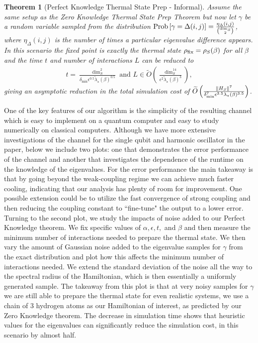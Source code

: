 \documentclass[11pt]{article}
\newtheorem{theorem}{Theorem}
\newcommand{\prob}[1]{{\rm Prob}\left[ #1 \right]}
\newcommand{\bigotilde}[1]{\widetilde{O} \left( #1 \right)}
\begin{document}
\begin{theorem}[Perfect Knowledge Thermal State Prep - Informal] 
    Assume the same setup as the Zero Knowledge Thermal State Prep Theorem but now let $\gamma$ be a random variable sampled from the distribution $\prob{\gamma = \Delta(i,j)} = \frac{\eta_\Delta(i,j)}{\binom{\dim_S}{2}}$, where $\eta_\Delta(i,j)$ is the number of times a particular eigenvalue difference appears. In this scenario the fixed point is exactly the thermal state $\rho_{\rm fix} = \rho_S(\beta)$ for all $\beta$ and the time $t$ and number of interactions $L$ can be reduced to 
    \begin{align}
         t = \frac{\dim_S^2}{\delta_{\min} \epsilon^{0.5} \widetilde{\lambda}_\star(\beta)^{0.5}}\text{ and } L \in \bigotilde{\frac{\dim_S^{14}}{\epsilon^2 \widetilde{\lambda}_\star(\beta)^3}},
     \end{align}
     giving an asymptotic reduction in the total simulation cost of $\widetilde{O}\left({\frac{\|{H_S}\|^7}{\delta_{\rm min}^7 \epsilon^{3.5}
\lambda_\star(\beta)^{3.5}}}\right)$. 
\end{theorem}

One of the key features of our algorithm is the simplicity of the resulting channel which is easy to implement on a quantum computer and easy to study numerically on classical computers. Although we have more extensive investigations of the channel for the single qubit and harmonic oscillator in the paper, below we include two plots: one that demonstrates the error performance of the channel and another that investigates the dependence of the runtime on the knowledge of the eigenvalues. For the error performance the main takeaway is that by going beyond the weak-coupling regime we can achieve much faster cooling, indicating that our analysis has plenty of room for improvement. One possible extension could be to utilize the fast convergence of strong coupling and then reducing the coupling constant to ``fine-tune" the output to a lower error. Turning to the second plot, we study the impacts of noise added to our Perfect Knowledge theorem. We fix specific values of $\alpha, \epsilon, t,$ and $\beta$ and then measure the minimum number of interactions needed to prepare the thermal state. We then vary the amount of Gaussian noise added to the eigenvalue samples for $\gamma$ from the exact distribution and plot how this affects the minimum number of interactions needed. We extend the standard deviation of the noise all the way to the spectral radius of the Hamiltonian, which is then essentially a uniformly generated sample. The takeaway from this plot is that at very noisy samples for $\gamma$ we are still able to prepare the thermal state for even realistic systems, we use a chain of 3 hydrogen atoms as our Hamiltonian of interest, as predicted by our Zero Knowledge theorem. The decrease in simulation time shows that heuristic values for the eigenvalues can significantly reduce the simulation cost, in this scenario by almost half. 
\end{document}
